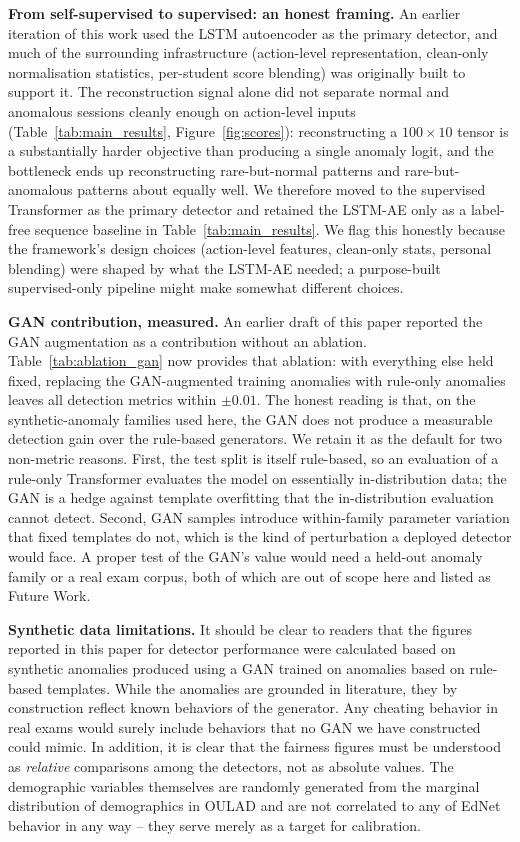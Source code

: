 \documentclass[sigconf]{acmart}
\begin{document}
\textbf{From self-supervised to supervised: an honest framing.} An earlier iteration of this work used the LSTM autoencoder as the primary detector, and much of the surrounding infrastructure (action-level representation, clean-only normalisation statistics, per-student score blending) was originally built to support it. The reconstruction signal alone did not separate normal and anomalous sessions cleanly enough on action-level inputs (Table~\ref{tab:main_results}, Figure~\ref{fig:scores}): reconstructing a $100 \times 10$ tensor is a substantially harder objective than producing a single anomaly logit, and the bottleneck ends up reconstructing rare-but-normal patterns and rare-but-anomalous patterns about equally well. We therefore moved to the supervised Transformer as the primary detector and retained the LSTM-AE only as a label-free sequence baseline in Table~\ref{tab:main_results}. We flag this honestly because the framework's design choices (action-level features, clean-only stats, personal blending) were shaped by what the LSTM-AE needed; a purpose-built supervised-only pipeline might make somewhat different choices.

\textbf{GAN contribution, measured.} An earlier draft of this paper reported the GAN augmentation as a contribution without an ablation. Table~\ref{tab:ablation_gan} now provides that ablation: with everything else held fixed, replacing the GAN-augmented training anomalies with rule-only anomalies leaves all detection metrics within $\pm 0.01$. The honest reading is that, on the synthetic-anomaly families used here, the GAN does not produce a measurable detection gain over the rule-based generators. We retain it as the default for two non-metric reasons. First, the test split is itself rule-based, so an evaluation of a rule-only Transformer evaluates the model on essentially in-distribution data; the GAN is a hedge against template overfitting that the in-distribution evaluation cannot detect. Second, GAN samples introduce within-family parameter variation that fixed templates do not, which is the kind of perturbation a deployed detector would face. A proper test of the GAN's value would need a held-out anomaly family or a real exam corpus, both of which are out of scope here and listed as Future Work.

\textbf{Synthetic data limitations.} It should be clear to readers that the figures reported in this paper for detector performance were calculated based on synthetic anomalies produced using a GAN trained on anomalies based on rule-based templates. While the anomalies are grounded in literature, they by construction reflect known behaviors of the generator. Any cheating behavior in real exams would surely include behaviors that no GAN we have constructed could mimic. In addition, it is clear that the fairness figures must be understood as \emph{relative}  comparisons among the detectors, not as absolute values. The demographic variables themselves are randomly generated from the marginal distribution of demographics in OULAD and are not correlated to any of EdNet behavior in any way – they serve merely as a target for calibration.
\end{document}

